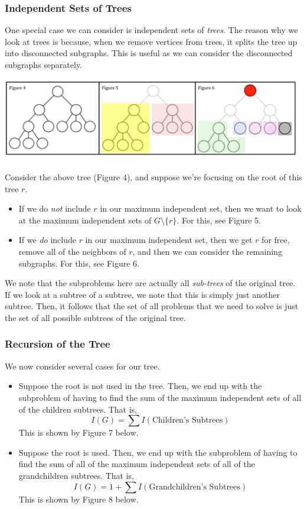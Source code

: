 \documentclass[letterpaper]{article}
\begin{document}
\subsubsection{Independent Sets of Trees}
One special case we can consider is independent sets of \emph{trees}. The reason why we look at trees is because, when we remove vertices from trees, it splits the tree up into disconnected subgraphs. This is useful as we can consider the disconnected subgraphs separately.
\begin{center}
    \includegraphics[scale=0.35]{assets/indep_set_tree.png}
\end{center}
Consider the above tree (Figure 4), and suppose we're focusing on the root of this tree $r$.
\begin{itemize}
    \item If we do \emph{not} include $r$ in our maximum independent set, then we want to look at the maximum independent sets of $G \setminus \{r\}$. For this, see Figure 5. 
    \item If we \emph{do} include $r$ in our maximum independent set, then we get $r$ for free, remove all of the neighbors of $r$, and then we can consider the remaining subgraphs. For this, see Figure 6. 
\end{itemize}
We note that the subproblems here are actually all \emph{sub-trees} of the original tree. If we look at a subtree of a subtree, we note that this is simply just another subtree. Then, it follows that the set of all problems that we need to solve is just the set of all possible subtrees of the original tree. 

\subsubsection{Recursion of the Tree}
We now consider several cases for our tree. 
\begin{itemize}
    \item Suppose the root is not used in the tree. Then, we end up with the subproblem of having to find the sum of the maximum independent sets of all of the children subtrees. That is, 
    \[I(G) = \sum I(\text{Children's Subtrees})\]
    This is shown by Figure 7 below.

    \item Suppose the root is used. Then, we end up with the subproblem of having to find the sum of all of the maximum independent sets of all of the grandchildren subtrees. That is, 
    \[I(G) = 1 + \sum I(\text{Grandchildren's Subtrees})\]
    This is shown by Figure 8 below.
\end{itemize}
\end{document}
